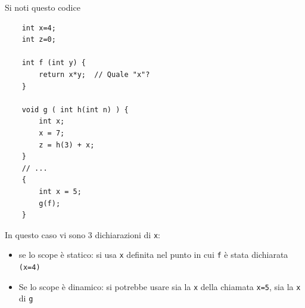 Si noti questo codice
\begin{lstlisting}
    int x=4; 
    int z=0;

    int f (int y) {
        return x*y;  // Quale "x"?
    }

    void g ( int h(int n) ) {
        int x;
        x = 7;
        z = h(3) + x;
    }
    // ...
    { 
        int x = 5;
        g(f);
    }
\end{lstlisting}
In questo caso vi sono 3 dichiarazioni di \texttt{x}:
\begin{itemize}
    \item se lo scope è statico: si usa \texttt{x} definita nel punto in cui \texttt{f} è stata dichiarata \texttt{(x=4)}
    \item Se lo scope è dinamico: si potrebbe usare sia la \texttt{x} della chiamata \texttt{x=5}, sia la \texttt{x} di \texttt{g}
\end{itemize}

